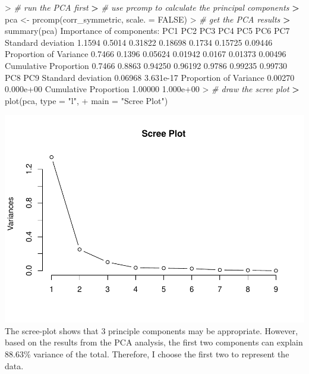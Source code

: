 \documentclass[
]{article}
\newenvironment{Shaded}{\begin{snugshade}}{\end{snugshade}}
\newcommand{\AttributeTok}[1]{\textcolor[rgb]{0.77,0.63,0.00}{#1}}
\newcommand{\CommentTok}[1]{\textcolor[rgb]{0.56,0.35,0.01}{\textit{#1}}}
\newcommand{\ConstantTok}[1]{\textcolor[rgb]{0.00,0.00,0.00}{#1}}
\newcommand{\ErrorTok}[1]{\textcolor[rgb]{0.64,0.00,0.00}{\textbf{#1}}}
\newcommand{\FloatTok}[1]{\textcolor[rgb]{0.00,0.00,0.81}{#1}}
\newcommand{\FunctionTok}[1]{\textcolor[rgb]{0.00,0.00,0.00}{#1}}
\newcommand{\NormalTok}[1]{#1}
\newcommand{\OtherTok}[1]{\textcolor[rgb]{0.56,0.35,0.01}{#1}}
\newcommand{\SpecialCharTok}[1]{\textcolor[rgb]{0.00,0.00,0.00}{#1}}
\newcommand{\StringTok}[1]{\textcolor[rgb]{0.31,0.60,0.02}{#1}}
\begin{document}
\begin{Shaded}
\begin{Highlighting}[]
\SpecialCharTok{\textgreater{}} \CommentTok{\# run the PCA first}
\ErrorTok{\textgreater{}} \CommentTok{\# use prcomp to calculate the principal components}
\ErrorTok{\textgreater{}}\NormalTok{ pca }\OtherTok{\textless{}{-}} \FunctionTok{prcomp}\NormalTok{(corr\_symmetric, }\AttributeTok{scale. =} \ConstantTok{FALSE}\NormalTok{)}
\SpecialCharTok{\textgreater{}} \CommentTok{\# get the PCA results}
\ErrorTok{\textgreater{}} \FunctionTok{summary}\NormalTok{(pca)}
\NormalTok{Importance of components}\SpecialCharTok{:}
\NormalTok{                          PC1    PC2     PC3     PC4    PC5     PC6     PC7}
\NormalTok{Standard deviation     }\FloatTok{1.1594} \FloatTok{0.5014} \FloatTok{0.31822} \FloatTok{0.18698} \FloatTok{0.1734} \FloatTok{0.15725} \FloatTok{0.09446}
\NormalTok{Proportion of Variance }\FloatTok{0.7466} \FloatTok{0.1396} \FloatTok{0.05624} \FloatTok{0.01942} \FloatTok{0.0167} \FloatTok{0.01373} \FloatTok{0.00496}
\NormalTok{Cumulative Proportion  }\FloatTok{0.7466} \FloatTok{0.8863} \FloatTok{0.94250} \FloatTok{0.96192} \FloatTok{0.9786} \FloatTok{0.99235} \FloatTok{0.99730}
\NormalTok{                           PC8       PC9}
\NormalTok{Standard deviation     }\FloatTok{0.06968} \FloatTok{3.631e{-}17}
\NormalTok{Proportion of Variance }\FloatTok{0.00270} \FloatTok{0.000e+00}
\NormalTok{Cumulative Proportion  }\FloatTok{1.00000} \FloatTok{1.000e+00}
\SpecialCharTok{\textgreater{}} \CommentTok{\# draw the scree plot }
\ErrorTok{\textgreater{}} \FunctionTok{plot}\NormalTok{(pca, }\AttributeTok{type =} \StringTok{"l"}\NormalTok{, }
\SpecialCharTok{+}      \AttributeTok{main =} \StringTok{"Scree Plot"}\NormalTok{)}
\end{Highlighting}
\end{Shaded}

\includegraphics{HUDM6122-Homework_05-Chenguang-Pan_files/figure-latex/unnamed-chunk-11-1.pdf}
The scree-plot shows that 3 principle components may be appropriate.
However, based on the results from the PCA analysis, the first two
components can explain 88.63\% variance of the total. Therefore, I
choose the first two to represent the data.
\end{document}
